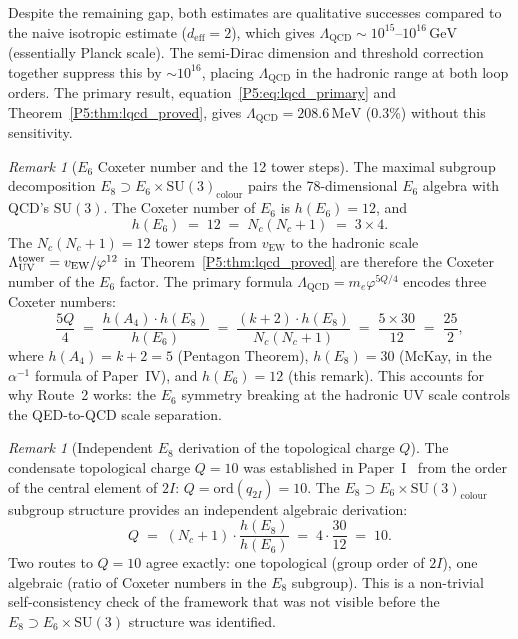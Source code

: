\documentclass[11pt,a4paper]{article}
\theoremstyle{definition}
\theoremstyle{remark}
\newtheorem{remark}[theorem]{Remark}
\newcommand{\vp}{\varphi}
\newcommand{\vEW}{v_{\mathrm{EW}}}
\newcommand{\LUV}{\Lambda_{\mathrm{UV}}}
\newcommand{\LQCD}{\Lambda_{\mathrm{QCD}}}
\newcommand{\deff}{d_{\mathrm{eff}}}
\begin{document}
Despite the remaining gap, both estimates are qualitative successes
compared to the naive isotropic estimate ($\deff=2$), which gives
$\LQCD\sim10^{15}$--$10^{16}\,\mathrm{GeV}$ (essentially Planck scale).
The semi-Dirac dimension and threshold correction together suppress
this by $\sim10^{16}$, placing $\LQCD$ in the hadronic range
at both loop orders.
The primary result, equation~\eqref{P5:eq:lqcd_primary} and Theorem~\ref{P5:thm:lqcd_proved},
gives $\LQCD = 208.6\,\mathrm{MeV}$ ($0.3\%$) without this sensitivity.

\begin{remark}[$E_6$ Coxeter number and the 12 tower steps]
\label{P5:rem:e6_coxeter}
The maximal subgroup decomposition
$E_8\supset E_6\times\mathrm{SU}(3)_{\mathrm{colour}}$ pairs the
78-dimensional $E_6$ algebra with QCD's $\mathrm{SU}(3)$.
The Coxeter number of $E_6$ is $h(E_6)=12$, and
\[
  h(E_6) \;=\; 12 \;=\; N_c(N_c+1) \;=\; 3\times4.
\]
The $N_c(N_c+1)=12$ tower steps from $\vEW$ to the hadronic scale
$\LUV^{\rm tower}=\vEW/\vp^{12}$ in Theorem~\ref{P5:thm:lqcd_proved}
are therefore the Coxeter number of the $E_6$ factor.
The primary formula $\LQCD = m_e\vp^{5Q/4}$ encodes three Coxeter numbers:
\begin{equation}
  \frac{5Q}{4}
  \;=\; \frac{h(A_4)\cdot h(E_8)}{h(E_6)}
  \;=\; \frac{(k+2)\cdot h(E_8)}{N_c(N_c+1)}
  \;=\; \frac{5\times30}{12}
  \;=\; \frac{25}{2},
  \label{P5:eq:lqcd_three_coxeters}
\end{equation}
where $h(A_4)=k+2=5$ (Pentagon Theorem), $h(E_8)=30$ (McKay, in the
$\alpha^{-1}$ formula of Paper~IV), and $h(E_6)=12$ (this remark).
This accounts for why Route~2 works: the $E_6$ symmetry breaking at the
hadronic UV scale controls the QED-to-QCD scale separation.
\end{remark}

\begin{remark}[Independent $E_8$ derivation of the topological charge $Q$]
\label{P5:rem:Q_double_derivation}
The condensate topological charge $Q=10$ was established in Paper~I~\cite{Paper1}
from the order of the central element of $2I$: $Q=\mathrm{ord}(q_{2I})=10$.
The $E_8\supset E_6\times\mathrm{SU}(3)_{\mathrm{colour}}$ subgroup structure
provides an independent algebraic derivation:
\begin{equation}
  Q
  \;=\; (N_c+1)\cdot\frac{h(E_8)}{h(E_6)}
  \;=\; 4\cdot\frac{30}{12}
  \;=\; 10.
  \label{P5:eq:Q_e8_derivation}
\end{equation}
Two routes to $Q=10$ agree exactly: one topological (group order of $2I$),
one algebraic (ratio of Coxeter numbers in the $E_8$ subgroup).
This is a non-trivial self-consistency check of the framework that was not
visible before the $E_8\supset E_6\times\mathrm{SU}(3)$ structure was identified.
\end{remark}
\end{document}
